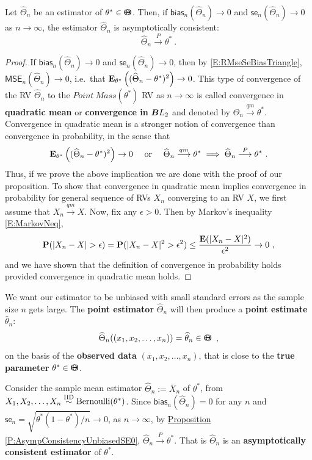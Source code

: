 \begin{prop}\label{P:AsympConsistencyUnbiasedSE0}
Let $\widehat{\Theta}_n$ be an estimator of $\theta^* \in {\Theta}\mspace{-11 mu}{\Theta}$.  Then, if $\mathsf{bias}_n(\widehat{\Theta}_n) \to 0$ and $\mathsf{se}_n(\widehat{\Theta}_n) \to 0$ as $n \to \infty$, the estimator $\widehat{\Theta}_n$ is asymptotically consistent:
\[
\widehat{\Theta}_n \overset{P}{\longrightarrow} \theta^* \ .
\]
{\scriptsize
\begin{proof}
If $\mathsf{bias}_n(\widehat{\Theta}_n) \to 0$ and $\mathsf{se}_n(\widehat{\Theta}_n) \to 0$, then by \eqref{E:RMseSeBiasTriangle}, $\mathsf{MSE}_n(\widehat{\Theta}_n) \to 0$, i.e.~that $\mathbf{E}_{\theta^*}\left( (\widehat{\Theta}_n-\theta^*)^2 \right) \to 0$.  This type of convergence of the RV $\widehat{\Theta}_n$ to the $Point~Mass(\theta^*)$ RV as $n \to \infty$ is called convergence in {\bf quadratic mean} or {\bf convergence in} $\B{L_2}$ and denoted by $\widehat{\Theta}_n \overset{qm}{\longrightarrow} \theta^*$.  Convergence in quadratic mean is a stronger notion of convergence than convergence in probability, in the sense that 
\[
\mathbf{E}_{\theta^*}\left( (\widehat{\Theta}_n-\theta^*)^2 \right) \to 0 \quad \text{ or } \quad \widehat{\Theta}_n \overset{qm}{\longrightarrow} \theta^* \implies \widehat{\Theta}_n \overset{P}{\longrightarrow} \theta^* \ .
\]
Thus, if we prove the above implication we are done with the proof of our proposition.  To show that convergence in quadratic mean implies convergence in probability for general sequence of RVs $X_n$ converging to an RV $X$, we first assume that $X_n \overset{qm}{\longrightarrow} X$.
Now, fix any $\epsilon>0$.  Then by Markov's inequality \eqref{E:MarkovNeq},
\[
\p(|X_n-X|>\epsilon) = \p(|X_n-X|^2>\epsilon^2) \leq \frac{\e(|X_n-X|^2)}{\epsilon^2} \to 0 \ ,
\]
and we have shown that the definition of convergence in probability holds provided convergence in quadratic mean holds.
\end{proof}
}
\end{prop}
We want our estimator to be unbiased with small standard errors as the sample size $n$ gets large.  The {\bf point estimator} $\widehat{\Theta}_n$ will then produce a {\bf point estimate} $\widehat{\theta}_n$:
$$\widehat{\Theta}_n((x_1,x_2,\ldots,x_n)) = \widehat{\theta}_n \in {\Theta}\mspace{-11 mu}{\Theta} \enspace ,$$ on the basis of the {\bf observed data} $(x_1,x_2,\ldots,x_n)$, that is close to the {\bf true parameter} $\theta^* \in {\Theta}\mspace{-11 mu}{\Theta}$.

\begin{example}
Consider the sample mean estimator $\widehat{\Theta}_n := \overline{X}_n$ of $\theta^*$, from $X_1,X_2,\ldots,X_n \overset{{\rm IID}}{\sim} \mbox{{\rm Bernoulli}}(\theta^*)$.  Since $\mathsf{bias}_n(\widehat{\Theta}_n)=0$ for any $n$ and 
$\mathsf{se}_n=\sqrt{\theta^*(1-\theta^*)/n} \to 0$, as $n \to \infty$, by 
\hyperref[P:AsympConsistencyUnbiasedSE0]{Proposition \ref*{P:AsympConsistencyUnbiasedSE0}}, 
$\widehat{\Theta}_n \overset{P}{\longrightarrow} \theta^*$.  That is $\widehat{\Theta}_n$ is an {\bf asymptotically consistent estimator} of $\theta^*$.  
\end{example}

